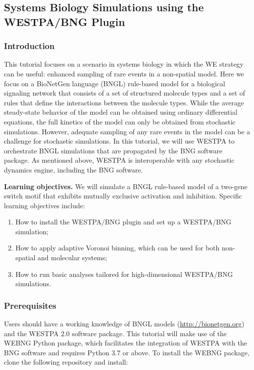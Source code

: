 \subsection{Systems Biology Simulations using the WESTPA/BNG Plugin}

\subsubsection{Introduction}
This tutorial focuses on a scenario in systems biology in which the WE strategy can be useful: enhanced sampling of rare events in a non-spatial model. 
Here we focus on a BioNetGen language (BNGL) rule-based model for a biological signaling network that consists of a set of structured molecule types and a set of rules that define the interactions between the molecule types. 
While the average steady-state behavior of the model can be obtained using ordinary differential equations, the full kinetics of the model can only be obtained from stochastic simulations. 
However, adequate sampling of any rare events in the model can be a challenge for stochastic simulations. 
In this tutorial, we will use WESTPA to orchestrate BNGL simulations that are propagated by the BNG software package. 
As mentioned above, WESTPA is interoperable with any stochastic dynamics engine, including the BNG software.

\textbf{Learning objectives.} We will simulate a BNGL rule-based model of a two-gene switch motif that exhibits mutually exclusive activation and inhibition.
Specific learning objectives include:
\begin{enumerate}
    \item How to install the WESTPA/BNG plugin and set up a WESTPA/BNG simulation; 
    \item How to apply adaptive Voronoi binning, which can be used for both non-spatial and molecular systems; 
    \item How to run basic analyses tailored for high-dimensional WESTPA/BNG simulations.
\end{enumerate} \linebreak

\subsubsection{Prerequisites}
Users should have a working knowledge of BNGL models ({\url{http://bionetgen.org}}) and the WESTPA 2.0 software package. 
This tutorial will make use of the WEBNG Python package, which facilitates the integration of WESTPA with the BNG software and requires Python 3.7 or above. 
To install the WEBNG package, clone the following repository and install: 

